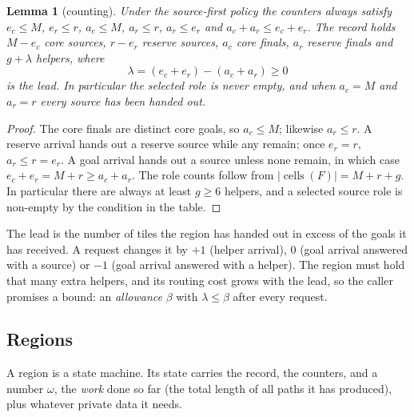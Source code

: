 \documentclass[11pt]{amsart}
\newtheorem{lemma}[theorem]{Lemma}
\theoremstyle{definition}
\newcommand{\cells}{\operatorname{cells}}
\begin{document}
\begin{lemma}[counting]\label{lem:count}
Under the source-first policy the counters always satisfy
$e_c\le M$, $e_r\le r$, $a_c\le M$, $a_r\le r$, $a_r\le e_r$ and $a_c+a_r\le e_c+e_r$. The record
holds $M-e_c$ core sources, $r-e_r$ reserve sources, $a_c$ core finals, $a_r$ reserve finals and
$g+\lambda$ helpers, where
\[
\lambda=(e_c+e_r)-(a_c+a_r)\ge0
\]
is the \emph{lead}. In particular the selected role is never empty, and
when $a_c=M$ and $a_r=r$ every source has been handed out.
\end{lemma}

\begin{proof}
The core finals are distinct core goals, so $a_c\le M$; likewise $a_r\le r$. A reserve arrival hands out a
reserve source while any remain; once $e_r=r$, $a_r\le r=e_r$. A goal arrival hands out a
source unless none remain, in which case $e_c+e_r=M+r\ge a_c+a_r$. The role counts follow from
$|\cells(F)|=M+r+g$. In particular there are always at least $g\ge6$ helpers, and a
selected source role is non-empty by the condition in the table.
\end{proof}

The lead is the number of tiles the region has handed out in excess of the goals it has received.
A request changes it by $+1$ (helper arrival), $0$ (goal arrival answered with a source) or $-1$ (goal
arrival answered with a helper). The region must hold that many extra helpers, and its routing cost
grows with the lead, so the caller promises a bound: an \emph{allowance} $\beta$ with $\lambda\le\beta$
after every request.

\subsection{Regions}
A region is a state machine. Its state carries the record, the counters, and a number $\omega$, the \emph{work}
done so far (the total length of all paths it has produced), plus whatever private data it needs.
\end{document}
